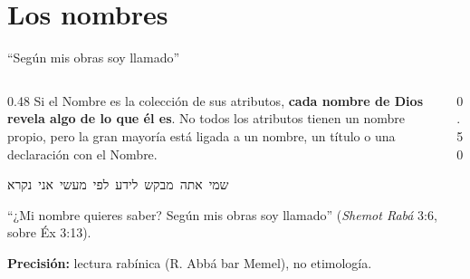 \documentclass[hyperref={bookmarks=false},aspectratio=169]{beamer}
\newcommand{\heb}[1]{\mbox{\foreignlanguage{hebrew}{#1}}}
\newcommand{\destacar}[1]{\textbf{\textcolor{azulp}{#1}}}
\newcommand{\SENOR}{SEÑOR}
\begin{document}
\section{Los nombres}
\providecommand{\precision}[1]{{\footnotesize\color{grisaz}\textbf{Precisión:} #1}}

\begin{frame}{``Según mis obras soy llamado''}
\begin{columns}[c,onlytextwidth]
\begin{column}{0.48\textwidth}
\small Si el Nombre es la colección de sus atributos, \destacar{cada nombre de Dios revela algo de lo que él es}. No todos los atributos tienen un nombre propio, pero la gran mayoría está ligada a un nombre, un título o una declaración con el Nombre.\par\medskip
\begin{center}\heb{שמי אתה מבקש לידע לפי מעשי אני נקרא}\end{center}
\footnotesize ``¿Mi nombre quieres saber? Según mis obras soy llamado'' (\emph{Shemot Rabá} 3:6, sobre Éx 3:13).\par\smallskip
\precision{lectura rabínica (R. Abbá bar Memel), no etimología.}
\end{column}
\begin{column}{0.50\textwidth}
\centering
{}
\end{column}
\end{columns}
\end{frame}
\end{document}
